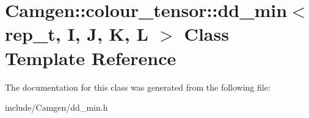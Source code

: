 \hypertarget{a00119}{}\section{Camgen\+:\+:colour\+\_\+tensor\+:\+:dd\+\_\+min$<$ rep\+\_\+t, I, J, K, L $>$ Class Template Reference}
\label{a00119}


The documentation for this class was generated from the following file\+:\begin{DoxyCompactItemize}
\item 
include/\+Camgen/dd\+\_\+min.\+h\end{DoxyCompactItemize}
